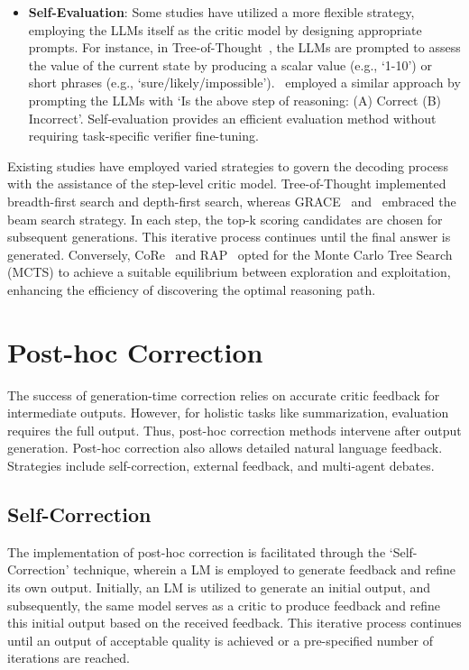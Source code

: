 \documentclass[a4paper,oneside]{book}
\begin{document}
\begin{itemize}
    \item \textbf{Self-Evaluation}: Some studies have utilized a more flexible strategy, employing the LLMs itself as the critic model by designing appropriate prompts. For instance, in Tree-of-Thought~\cite{yao2023tree}, the LLMs are prompted to assess the value of the current state by producing a scalar value (e.g., `1-10') or short phrases (e.g., `sure/likely/impossible').~\cite{xie2023selfevaluation} employed a similar approach by prompting the LLMs with `Is the above step of reasoning: (A) Correct (B) Incorrect'. Self-evaluation provides an efficient evaluation method without requiring task-specific verifier fine-tuning.
\end{itemize}

Existing studies have employed varied strategies to govern the decoding process with the assistance of the step-level critic model. Tree-of-Thought implemented breadth-first search and depth-first search, whereas GRACE~\cite{khalifa2023grace} and~\cite{xie2023selfevaluation} embraced the beam search strategy. In each step, the top-k scoring candidates are chosen for subsequent generations. This iterative process continues until the final answer is generated. Conversely, CoRe~\cite{zhu-etal-2023-solving} and RAP~\cite{hao2023reasoning} opted for the Monte Carlo Tree Search (MCTS) to achieve a suitable equilibrium between exploration and exploitation, enhancing the efficiency of discovering the optimal reasoning path.

\section{Post-hoc Correction}
The success of generation-time correction relies on accurate critic feedback for intermediate outputs. However, for holistic tasks like summarization, evaluation requires the full output. Thus, post-hoc correction methods intervene after output generation. Post-hoc correction also allows detailed natural language feedback. Strategies include self-correction, external feedback, and multi-agent debates.

\subsection{Self-Correction}
The implementation of post-hoc correction is facilitated through the `Self-Correction' technique, wherein a LM is employed to generate feedback and refine its own output. Initially, an LM is utilized to generate an initial output, and subsequently, the same model serves as a critic to produce feedback and refine this initial output based on the received feedback. This iterative process continues until an output of acceptable quality is achieved or a pre-specified number of iterations are reached.
\end{document}
